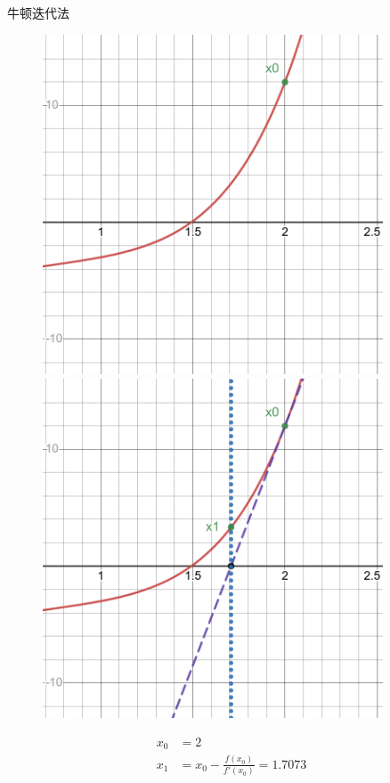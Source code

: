 \documentclass{beamer}
\begin{document}
\begin{frame}{牛顿迭代法}
    \begin{figure}[H]
        \centering
        \begin{minipage}[t]{0.48\textwidth}
            \centering
            \includegraphics[width=0.9\textwidth]{pic/newton1.png}
        \end{minipage}
        \begin{minipage}[t]{0.48\textwidth}
            \centering
            \includegraphics[width=0.9\textwidth]{pic/newton2.png}
        \end{minipage}
    \end{figure}
    \begin{align*}
        x_0 &= 2\\
        x_1 &= x_0 - \frac{f(x_0)}{f'(x_0)} = 1.7073
    \end{align*}
\end{frame}
\end{document}
